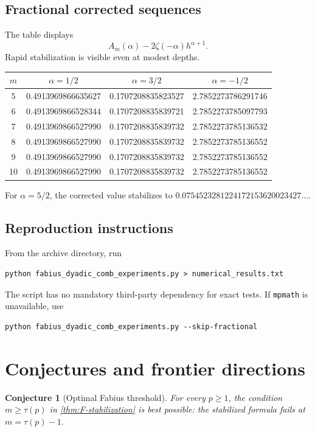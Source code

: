 \documentclass[11pt]{article}
\newtheorem{conjecture}[theorem]{Conjecture}
\theoremstyle{definition}
\begin{document}
\subsection{Fractional corrected sequences}

The table displays
\[
 A_m(\alpha)-2\zeta(-\alpha)h^{\alpha+1}.
\]
Rapid stabilization is visible even at modest depths.
\begin{center}
\begin{tabular}{c|c|c|c}
\toprule
$m$ & $\alpha=1/2$ & $\alpha=3/2$ & $\alpha=-1/2$\\
\midrule
5  & 0.4913969866635627 & 0.1707208835823527 & 2.7852273786291746\\
6  & 0.4913969866528344 & 0.1707208835839721 & 2.7852273785097793\\
7  & 0.4913969866527990 & 0.1707208835839732 & 2.7852273785136532\\
8  & 0.4913969866527990 & 0.1707208835839732 & 2.7852273785136552\\
9  & 0.4913969866527990 & 0.1707208835839732 & 2.7852273785136552\\
10 & 0.4913969866527990 & 0.1707208835839732 & 2.7852273785136552\\
\bottomrule
\end{tabular}
\end{center}
For $\alpha=5/2$, the corrected value stabilizes to
$0.0754523281224172153620023427\ldots$.

\subsection{Reproduction instructions}

From the archive directory, run
\begin{lstlisting}[style=pythonstyle]
python fabius_dyadic_comb_experiments.py > numerical_results.txt
\end{lstlisting}
The script has no mandatory third-party dependency for exact tests.  If
\texttt{mpmath} is unavailable, use
\begin{lstlisting}[style=pythonstyle]
python fabius_dyadic_comb_experiments.py --skip-fractional
\end{lstlisting}

\section{Conjectures and frontier directions}
\label{sec:future}

\begin{conjecture}[Optimal Fabius threshold]
\label{conj:threshold-optimal}
For every $p\ge1$, the condition $m\ge\tau(p)$ in
\cref{thm:F-stabilization} is best possible: the stabilized formula fails at
$m=\tau(p)-1$.
\end{conjecture}
\end{document}
